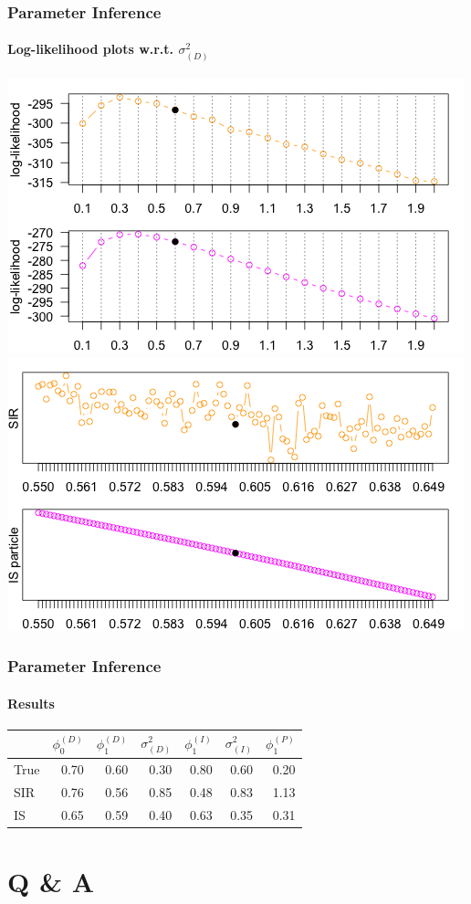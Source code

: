 \documentclass[11pt]{beamer}
\begin{document}
\begin{frame}
\frametitle{Parameter Inference}
\framesubtitle{Log-likelihood plots w.r.t. $\sigma_{(D)}^2$}
\centering
\includegraphics[scale=0.30]{hdpm-loglik-Dvar}
\includegraphics[scale=0.30]{hdpm-loglik-Dvar-zoom}
\end{frame}

\begin{frame}
\frametitle{Parameter Inference}
\framesubtitle{Results}
\begin{table}
\centering
\begin{tabular}{l r r r r r r}
\hline
& $\phi_0^{(D)}$ &  $\phi_1^{(D)}$ & $\sigma^2_{(D)}$ & $\phi_1^{(I)}$ & $\sigma^2_{(I)}$ & $\phi_1^{(P)}$\\
\hline
True        & 0.70  & 0.60 &  0.30 & 0.80 & 0.60 & 0.20\\
SIR         & 0.76  & 0.56  & 0.85 & 0.48 & 0.83 & 1.13\\
IS            & 0.65  & 0.59  & 0.40 & 0.63 & 0.35 & 0.31\\
\hline
\end{tabular}
\end{table}
\end{frame}

\section{Q \& A}
\end{document}

